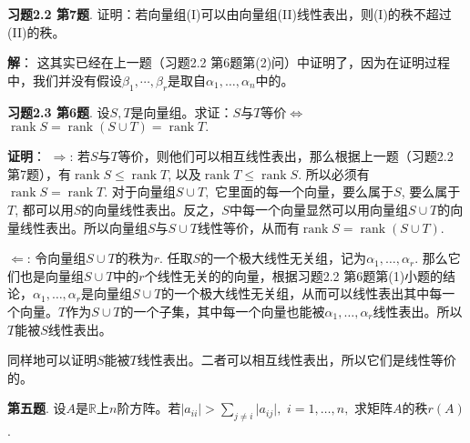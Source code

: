 \newpageorvspace

{\bf 习题2.2 第7题}. 证明：若向量组(I)可以由向量组(II)线性表出，则(I)的秩不超过(II)的秩。

\newpageorvspace

{\bf 解}： 这其实已经在上一题（习题2.2 第6题第(2)问）中证明了，因为在证明过程中，我们并没有假设$\beta_1, \cdots, \beta_r$是取自$\alpha_1, \ldots, \alpha_n$中的。

\newpageorvspace

{\bf 习题2.3 第6题}. 设$S, T$是向量组。求证：$S$与$T$等价$\Longleftrightarrow$ $\operatorname{rank} S = \operatorname{rank} (S\cup T) = \operatorname{rank} T.$

\newpageorvspace

{\bf 证明}： $\Longrightarrow$: 若$S$与$T$等价，则他们可以相互线性表出，那么根据上一题（习题2.2 第7题），有$\operatorname{rank} S \leqslant \operatorname{rank} T$, 以及$\operatorname{rank} T \leqslant \operatorname{rank} S$. 所以必须有$\operatorname{rank} S = \operatorname{rank} T.$ 对于向量组$S\cup T,$ 它里面的每一个向量，要么属于$S$, 要么属于$T$, 都可以用$S$的向量线性表出。反之，$S$中每一个向量显然可以用向量组$S\cup T$的向量线性表出。所以向量组$S$与$S\cup T$线性等价，从而有$\operatorname{rank} S = \operatorname{rank} (S\cup T).$

$\Longleftarrow$: 令向量组$S\cup T$的秩为$r$. 任取$S$的一个极大线性无关组，记为$\alpha_1, \ldots, \alpha_r$. 那么它们也是向量组$S\cup T$中的$r$个线性无关的的向量，根据习题2.2 第6题第(1)小题的结论，$\alpha_1, \ldots, \alpha_r$是向量组$S\cup T$的一个极大线性无关组，从而可以线性表出其中每一个向量。$T$作为$S\cup T$的一个子集，其中每一个向量也能被$\alpha_1, \ldots, \alpha_r$线性表出。所以$T$能被$S$线性表出。

同样地可以证明$S$能被$T$线性表出。二者可以相互线性表出，所以它们是线性等价的。

\newpageorvspace

{\bf 第五题}. 设$A$是$\mathbb{R}$上$n$阶方阵。若$\lvert a_{ii} \rvert > \sum\limits_{j\neq i} \lvert a_{ij} \rvert,$ $i = 1, \ldots, n,$ 求矩阵$A$的秩$r(A)$.

\newpageorvspace

